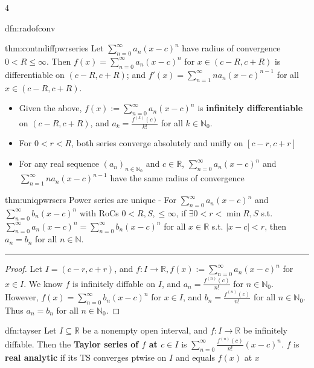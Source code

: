 \documentclass[landscape, 8pt]{extarticle}
\begin{document}
\begin{multicols*}{4}
\begin{dfn}{dfn:radofconv}{ }
		\end{dfn}
		
		
		\begin{thm}{thm:contndiffpwrseries}{ }
		Let $\sum_{n=0}^{\infty}a_n(x-c)^n$ have radius of convergence $0 < R \le \infty$. Then $f(x) = \sum_{n=0}^{\infty}a_n(x-c)^n$ for $x\in (c-R, c+R)$ is differentiable on $(c-R, c+R)$; and $f'(x) = \sum_{n=1}^{\infty}na_n(x-c)^{n-1}$ for all $x\in (c-R, c+R)$.
		\begin{itemize}
			\item Given the above, $f(x) := \sum_{n=0}^{\infty}a_n(x-c)^n$  is \textbf{infinitely differentiable} on $(c-R, c+R)$, and $a_k = \frac{f^{(k)}(c)}{k!}$ for all $k\in \mathbb{N}_0$.
			\item For $0 < r < R$, both series converge absolutely and unifly on $[c-r, c+r]$
			\item For any real sequence $(a_n)_{n\in \mathbb{N}_0}$ and $c\in \mathbb{R}$, $\sum_{n=0}^{\infty}a_n(x-c)^n$ and $\sum_{n=1}^{\infty}na_n(x-c)^{n-1}$ have the same radius of convergence
		\end{itemize}
		
		\end{thm}
		
		
		\begin{mthm}{thm:uniqpwrsers}{ }
		Power series are unique - For $\sum_{n=0}^{\infty}a_n(x-c)^n$ and $\sum_{n=0}^{\infty}b_n(x-c)^n$ with RoCs $0 < R, S, \le \infty$, if $\exists 0 < r < \min{R, S}$ s.t. $\sum_{n=0}^{\infty} a_n(x-c)^n = \sum_{n=0}^{\infty}b_n (x-c)^n$ for all $x\in \mathbb{R}$ s.t. $\left|x-c\right| < r$, then $a_n = b_n$ for all $n\in \mathbb{N}$.
		\vspace{1pt}
		\hrule	
		\vspace{-6pt}
		\begin{proof}
			Let $I = (c-r, c+r)$, and $f: I \to \mathbb{R}, f(x) := \sum_{n=0}^{\infty}a_n(x-c)^n$ for $x\in I$. We know $f$ is infinitely diffable on $I$, and $a_n = \frac{f^{(n)}(c)}{n!}$ for $n\in \mathbb{N}_0$. However, $f(x) = \sum_{n=0}^{\infty}b_n(x-c)^n$ for $x\in I$, and $b_n = \frac{f^{(n)}(c)}{n!}$ for all $n\in \mathbb{N}_0$. Thus $a_n = b_n$ for all $n\in \mathbb{N}_0$.
		\end{proof}
		
		\end{mthm}
		
		
		\begin{dfn}{dfn:tayser}{ }
		Let $I \subseteq \mathbb{R}$ be a nonempty open interval, and $f: I \to \mathbb{R}$ be infinitely diffable. Then the \textbf{Taylor series of $f$ at $c\in I$} is $\sum_{n=0}^{\infty}\frac{f^{(n)}(c)}{n!}(x-c)^n$.
		$f$ is \textbf{real analytic} if its TS converges ptwise on $I$ and equals $f(x)$ at $x$
		

\end{dfn}
\end{multicols*}
\end{document}

